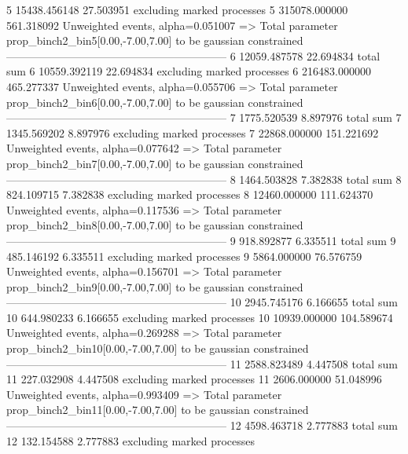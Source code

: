 5          15438.456148    27.503951       excluding marked processes    
5          315078.000000   561.318092      Unweighted events, alpha=0.051007
  => Total parameter prop_binch2_bin5[0.00,-7.00,7.00] to be gaussian constrained
------------------------------------------------------------
6          12059.487578    22.694834       total sum                     
6          10559.392119    22.694834       excluding marked processes    
6          216483.000000   465.277337      Unweighted events, alpha=0.055706
  => Total parameter prop_binch2_bin6[0.00,-7.00,7.00] to be gaussian constrained
------------------------------------------------------------
7          1775.520539     8.897976        total sum                     
7          1345.569202     8.897976        excluding marked processes    
7          22868.000000    151.221692      Unweighted events, alpha=0.077642
  => Total parameter prop_binch2_bin7[0.00,-7.00,7.00] to be gaussian constrained
------------------------------------------------------------
8          1464.503828     7.382838        total sum                     
8          824.109715      7.382838        excluding marked processes    
8          12460.000000    111.624370      Unweighted events, alpha=0.117536
  => Total parameter prop_binch2_bin8[0.00,-7.00,7.00] to be gaussian constrained
------------------------------------------------------------
9          918.892877      6.335511        total sum                     
9          485.146192      6.335511        excluding marked processes    
9          5864.000000     76.576759       Unweighted events, alpha=0.156701
  => Total parameter prop_binch2_bin9[0.00,-7.00,7.00] to be gaussian constrained
------------------------------------------------------------
10         2945.745176     6.166655        total sum                     
10         644.980233      6.166655        excluding marked processes    
10         10939.000000    104.589674      Unweighted events, alpha=0.269288
  => Total parameter prop_binch2_bin10[0.00,-7.00,7.00] to be gaussian constrained
------------------------------------------------------------
11         2588.823489     4.447508        total sum                     
11         227.032908      4.447508        excluding marked processes    
11         2606.000000     51.048996       Unweighted events, alpha=0.993409
  => Total parameter prop_binch2_bin11[0.00,-7.00,7.00] to be gaussian constrained
------------------------------------------------------------
12         4598.463718     2.777883        total sum                     
12         132.154588      2.777883        excluding marked processes    
